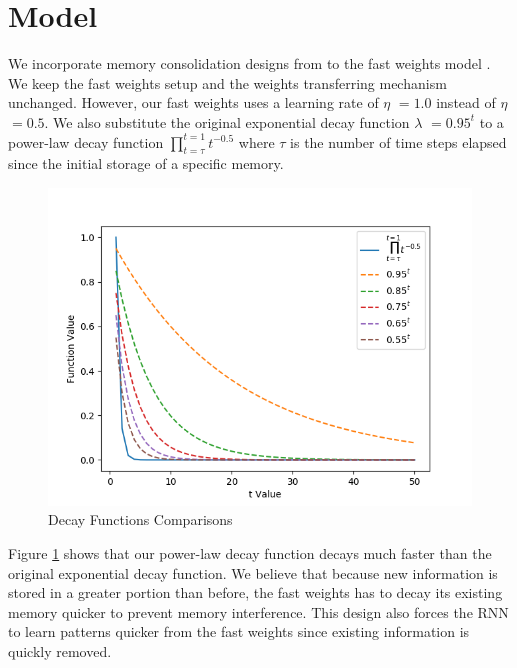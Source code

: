 \documentclass[10pt,letterpaper]{article}
\begin{document}

\section{Model}
We incorporate memory consolidation designs from \cite{pld} to the fast weights model \cite{fw}.
We keep the fast weights setup and the weights transferring mechanism unchanged.
However, our fast weights uses a learning rate of $\eta$ $=1.0$ instead of $\eta$ $=0.5$.
We also substitute the original exponential decay function $\lambda$ $=0.95^t$ to a power-law decay function $\prod_{t=\tau}^{t=1} t^{-0.5}$ where $\tau$ is the number of time steps elapsed since the initial storage of a specific memory. 
\begin{figure}[h]
  \centering
  \vskip -0.12in
  \includegraphics[width=\columnwidth]{decays}
  \vskip -0.06in
  \caption{Decay Functions Comparisons}
  \label{fig:decay}
\end{figure}

Figure \ref{fig:decay} shows that our power-law decay function decays much faster than the original exponential decay function. 
We believe that because new information is stored in a greater portion than before, the fast weights has to decay its existing memory quicker to prevent memory interference. 
This design also forces the RNN to learn patterns quicker from the fast weights since existing information is quickly removed.
\end{document}
